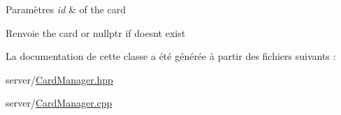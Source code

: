 \begin{DoxyParams}{Paramètres}
{\em id} & of the card \\
\hline
\end{DoxyParams}
\begin{DoxyReturn}{Renvoie}
the card or nullptr if doesn\textquotesingle{}t exist 
\end{DoxyReturn}


La documentation de cette classe a été générée à partir des fichiers suivants \+:\begin{DoxyCompactItemize}
\item 
server/\hyperlink{CardManager_8hpp}{Card\+Manager.\+hpp}\item 
server/\hyperlink{CardManager_8cpp}{Card\+Manager.\+cpp}\end{DoxyCompactItemize}

